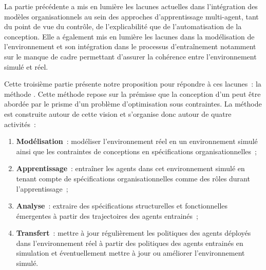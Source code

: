 
La partie précédente a mis en lumière les lacunes actuelles dans l'intégration des modèles organisationnels au sein des approches d'apprentissage multi-agent, tant du point de vue du contrôle, de l'explicabilité que de l'automatisation de la conception. Elle a également mis en lumière les lacunes dans la modélisation de l'environnement et son intégration dans le processus d’entraînement notamment sur le manque de cadre permettant d'assurer la cohérence entre l'environnement simulé et réel.

\medskip

\noindent
Cette troisième partie présente notre proposition pour répondre à ces lacunes~: la méthode . Cette méthode repose sur la prémisse que la conception d'un  peut être abordée par le prisme d'un problème d'optimisation sous contraintes. La méthode est construite autour de cette vision et s'organise donc autour de quatre activités~:

\begin{enumerate}
  \item \textbf{Modélisation}~: modéliser l'environnement réel en un environnement simulé ainsi que les contraintes de conceptions en spécifications organisationnelles~;
  \item \textbf{Apprentissage}~: entraîner les agents dans cet environnement simulé en tenant compte de spécifications organisationnelles comme des rôles durant l'apprentissage~;
  \item \textbf{Analyse}~: extraire des spécifications structurelles et fonctionnelles émergentes à partir des trajectoires des agents entrainés~;
  \item \textbf{Transfert}~: mettre à jour régulièrement les politiques des agents déployés dans l'environnement réel à partir des politiques des agents entrainés en simulation et éventuellement mettre à jour ou améliorer l'environnement simulé.
\end{enumerate}

